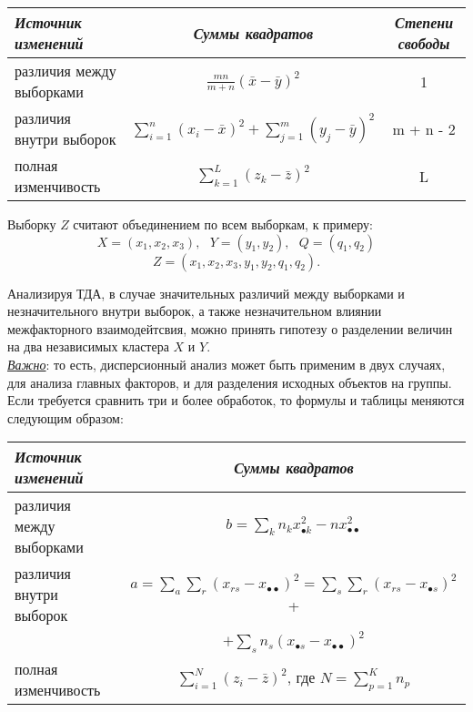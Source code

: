 \documentclass[12pt]{article}
\begin{document}
\begin{center}
\bgroup
\def\arraystretch{2.5}
\begin{tabular}{|l|c|c|}
        \hline
	    \textit{Источник изменений} & \textit{Суммы квадратов} & \textit{Степени свободы}\\
        \hline
	    различия между выборками & $\frac{mn}{m+n} ( \bar{x} - \bar{y})^2$ & 1\\
	    различия внутри выборок & $\sum\limits_{i=1}^n (x_i - \bar{x})^2 + \sum\limits_{j=1}^m (y_j - \bar{y})^2$ & m + n - 2\\
	    полная изменчивость & $\sum\limits_{k=1}^L (z_k - \bar{z})^2$ & L\\
        \hline
\end{tabular}
\egroup
\end{center}

Выборку $Z$ считают объединением по всем выборкам, к примеру:
\[ X = (x_1, x_2, x_3), ~~~ Y = (y_1, y_2), ~~~ Q = (q_1, q_2)\]
\[ Z = (x_1, x_2, x_3, y_1, y_2, q_1, q_2). \]

Анализируя ТДА, в случае значительных различий между выборками и незначительного внутри выборок, а также незначительном влиянии межфакторного взаимодейтсвия, можно принять гипотезу о разделении величин на два независимых кластера $X$ и $Y$.\\

\underline{\emph{Важно}}: то есть, дисперсионный анализ может быть применим в двух случаях, для анализа главных факторов, и для разделения исходных объектов на группы.\\

Если требуется сравнить три и более обработок, то формулы и таблицы меняются следующим образом:

\begin{center}
\bgroup
\def\arraystretch{2.5}
\begin{tabular}{|l|c|}
        \hline
	    \textit{Источник изменений} & \textit{Суммы квадратов}\\
        \hline
	    различия между выборками & $b = \sum\limits_k n_k x_{\bullet k}^2 - nx_{\bullet \bullet}^2 $\\
	    различия внутри выборок & $a = \sum\limits_a \sum\limits_r (x_{rs} - x_{\bullet \bullet} )^2 = \sum\limits_s \sum\limits_r (x_{rs} - x_{\bullet s})^2 $ +\\
	     & $+ \sum\limits_s n_s (x_{\bullet s} - x_{\bullet \bullet} )^2$\\
        полная изменчивость & $\sum\limits_{i=1}^N (z_i - \bar{z})^2$, где $N = \sum\limits_{p=1}^K n_p$\\
        \hline
\end{tabular}
\egroup
\end{center}
\end{document}
